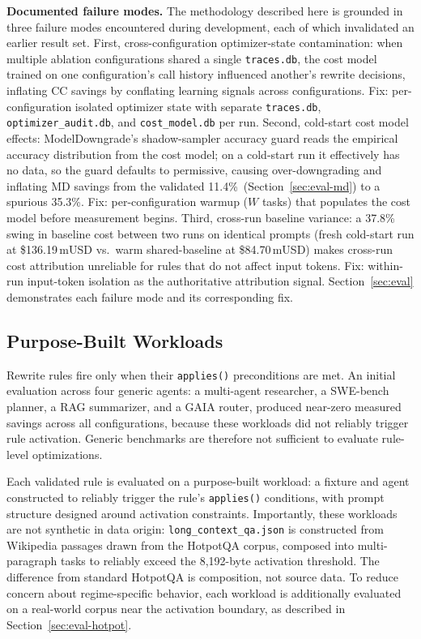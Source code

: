 \textbf{Documented failure modes.} The methodology described here is grounded in
three failure modes encountered during development, each of which invalidated an
earlier result set. First, cross-configuration optimizer-state contamination: when
multiple ablation configurations shared a single \texttt{traces.db}, the cost model
trained on one configuration's call history influenced another's rewrite decisions,
inflating CC savings by conflating learning signals across configurations. Fix:
per-configuration isolated optimizer state with separate \texttt{traces.db},
\texttt{optimizer\_audit.db}, and \texttt{cost\_model.db} per run. Second, cold-start
cost model effects: ModelDowngrade's shadow-sampler accuracy guard reads the empirical
accuracy distribution from the cost model; on a cold-start run it effectively has no
data, so the guard defaults to permissive, causing over-downgrading and inflating MD
savings from the validated 11.4\%~(Section~\ref{sec:eval-md}) to a spurious 35.3\%. Fix: per-configuration warmup
($W$ tasks) that populates the cost model before measurement begins. Third, cross-run
baseline variance: a 37.8\% swing in baseline cost between two runs on identical
prompts (fresh cold-start run at \$136.19\,mUSD vs.\ warm shared-baseline at
\$84.70\,mUSD) makes cross-run cost attribution unreliable for rules that do not
affect input tokens. Fix: within-run input-token isolation as the authoritative
attribution signal. Section~\ref{sec:eval} demonstrates each failure mode and its
corresponding fix.

\subsection{Purpose-Built Workloads}

Rewrite rules fire only when their \texttt{applies()} preconditions are met. An
initial evaluation across four generic agents: a multi-agent researcher, a
SWE-bench planner, a RAG summarizer, and a GAIA router, produced near-zero
measured savings across all configurations, because these workloads did not reliably
trigger rule activation. Generic benchmarks are therefore not sufficient to evaluate
rule-level optimizations.

Each validated rule is evaluated on a purpose-built workload: a fixture and agent
constructed to reliably trigger the rule's \texttt{applies()} conditions, with prompt
structure designed around activation constraints. Importantly, these workloads are not
synthetic in data origin: \texttt{long\_context\_qa.json} is constructed from
Wikipedia passages drawn from the HotpotQA corpus, composed into multi-paragraph tasks
to reliably exceed the 8,192-byte activation threshold. The difference from standard
HotpotQA is composition, not source data. To reduce concern about regime-specific
behavior, each workload is additionally evaluated on a real-world corpus near the
activation boundary, as described in Section~\ref{sec:eval-hotpot}.

